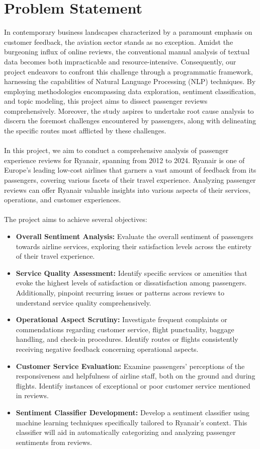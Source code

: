 \documentclass[11pt]{article} %
\begin{document}
\section{Problem Statement}
In contemporary business landscapes characterized by a paramount emphasis on customer feedback, the aviation sector stands as no exception. Amidst the burgeoning influx of online reviews, the conventional manual analysis of textual data becomes both impracticable and resource-intensive. Consequently, our project endeavors to confront this challenge through a programmatic framework, harnessing the capabilities of Natural Language Processing (NLP) techniques. By employing methodologies encompassing data exploration, sentiment classification, and topic modeling, this project aims to dissect passenger reviews comprehensively. Moreover, the study aspires to undertake root cause analysis to discern the foremost challenges encountered by passengers, along with delineating the specific routes most afflicted by these challenges.  \\
\\
In this project, we aim to conduct a comprehensive analysis of passenger experience reviews for
Ryanair, spanning from 2012 to 2024. Ryanair is one of Europe’s leading low-cost airlines that garners a vast amount of feedback from its passengers, covering various facets of their travel experience. Analyzing passenger reviews can offer Ryanair valuable insights into various aspects of their services, operations, and customer experiences.\\\\
The project aims to achieve several objectives:
\begin{itemize}
    \item \textbf{Overall Sentiment Analysis:} Evaluate the overall sentiment of passengers towards airline services, exploring their satisfaction levels across the entirety of their travel experience.
    \item \textbf{Service Quality Assessment:} Identify specific services or amenities that evoke the highest levels of satisfaction or dissatisfaction among passengers. Additionally, pinpoint recurring issues or patterns across reviews to understand service quality comprehensively.
    \item \textbf{Operational Aspect Scrutiny:} Investigate frequent complaints or commendations regarding customer service, flight punctuality, baggage handling, and check-in procedures. Identify routes or flights consistently receiving negative feedback concerning operational aspects.
    \item \textbf{Customer Service Evaluation:} Examine passengers' perceptions of the responsiveness and helpfulness of airline staff, both on the ground and during flights. Identify instances of exceptional or poor customer service mentioned in reviews.
    \item \textbf{Sentiment Classifier Development:} Develop a sentiment classifier using machine learning techniques specifically tailored to Ryanair's context. This classifier will aid in automatically categorizing and analyzing passenger sentiments from reviews.
\end{itemize}
\end{document}
